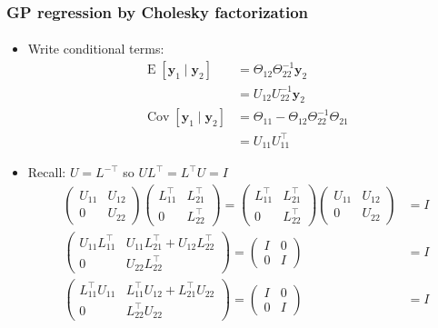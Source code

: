 \documentclass{beamer}                             %
\renewcommand{\vec}[1]{\bm{#1}}
\renewcommand{\vec}[1]{\bm{#1}}
\DeclareMathOperator{\E}{E}
\DeclareMathOperator{\Cov}{Cov}
\begin{document}
\begin{frame}
\frametitle{GP regression by Cholesky factorization}
\framesubtitle{}
\begin{itemize}
  \item<+-> Write conditional terms:
    \begin{align*}
      \E[\vec{y}_1 \mid \vec{y}_2] &= \Theta_{12} \Theta_{22}^{-1} \vec{y}_2 \\
      &= U_{12} U_{22}^{-1} \vec{y}_2 \\
      \Cov[\vec{y}_1 \mid \vec{y}_2]
        &= \Theta_{11} - \Theta_{12} \Theta_{22}^{-1} \Theta_{21} \\
      &= U_{11} U_{11}^{\top}
    \end{align*}
  \item<+-> Recall: \( U = L^{-\top} \) so \( U L^{\top} = L^{\top} U = I \)
    \begin{align*}
      \begin{pmatrix}
        U_{11} & U_{12} \\
        0 & U_{22}
      \end{pmatrix}
      \begin{pmatrix}
        L_{11}^{\top} & L_{21}^{\top} \\
        0 & L_{22}^{\top}
      \end{pmatrix}
      =
      \begin{pmatrix}
        L_{11}^{\top} & L_{21}^{\top} \\
        0 & L_{22}^{\top}
      \end{pmatrix}
      \begin{pmatrix}
        U_{11} & U_{12} \\
        0 & U_{22}
      \end{pmatrix}
      &= I \\
      \begin{pmatrix}
        U_{11} L_{11}^{\top} & U_{11} L_{21}^{\top} + U_{12} L_{22}^{\top} \\
        0 & U_{22} L_{22}^{\top}
      \end{pmatrix}
      =
      \begin{pmatrix}
        I & 0 \\
        0 & I
      \end{pmatrix}
      &= I \\
      \begin{pmatrix}
        L_{11}^{\top} U_{11} & L_{11}^{\top} U_{12} + L_{21}^{\top} U_{22} \\
        0 & L_{22}^{\top} U_{22}
      \end{pmatrix}
      =
      \begin{pmatrix}
        I & 0 \\
        0 & I
      \end{pmatrix}
      &= I
    \end{align*}
\end{itemize}

\end{frame}
\end{document}
